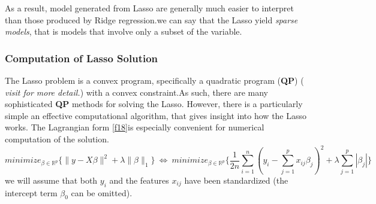 \documentclass[12pt]{report}
\renewcommand{\emph}{\textit}
\begin{document}
	As a result, model generated from Lasso are generally much easier to interpret than those produced by Ridge regression.we can say that the Lasso yield \emph{sparse models}, that is models that involve only a subset of the variable.
	\begin{center}
		\subsubsection{Computation of Lasso Solution}
	\end{center}
	The Lasso problem is a convex program, specifically a quadratic program (\textbf{QP}) ( \textsl{visit \cite{ref2} for more detail.}) with a convex constraint.As such, there are many sophisticated \textbf{QP} methods for solving the Lasso. However, there is a particularly simple an effective computational algorithm, that gives insight into how the Lasso works. The Lagrangian form \eqref{f18}is especially convenient for numerical computation of the solution.
	$$minimize_{\beta \in \mathbb{R}^{p} } \{ \parallel y- X\beta \parallel^{2}+ \lambda \parallel \beta \parallel_{1}\}\ \Leftrightarrow\ minimize_{\beta \in \mathbb{R}^{p}} \{ \frac{1}{2n}\sum_{i=1}^{n}(y_{i}-\sum_{j=1}^{p}x_{ij}\beta_{j})^{2}+\lambda \sum_{j=1}^{p}|\beta_{j}| \}$$
	we will assume that both $y_{i}$ and the features $x_{ij}$ have been standardized (the intercept term $\beta_{0}$ can be omitted). 
	
\end{document}
